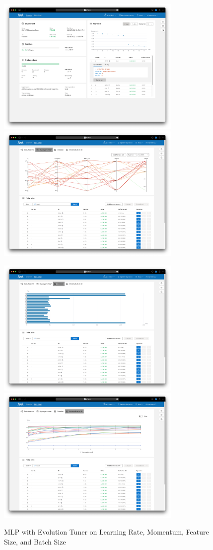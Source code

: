 \documentclass{article}
\begin{document}
\begin{figure}
	\centerline{\includegraphics[width=3.5in]{../proj3/figures/mlp_evolution_batch_overview.png}\includegraphics[width=3.5in]{../proj3/figures/mlp_evolution_batch_hyperparameter.png}}
	\centerline{\includegraphics[width=3.5in]{../proj3/figures/mlp_evolution_batch_latency.png}\includegraphics[width=3.5in]{../proj3/figures/mlp_evolution_batch_intermediate.png}}
	\caption{MLP with Evolution Tuner on Learning Rate, Momentum, Feature Size, and Batch Size}
	\label{fig:mlp-evolution-batch}
\end{figure}
\end{document}
